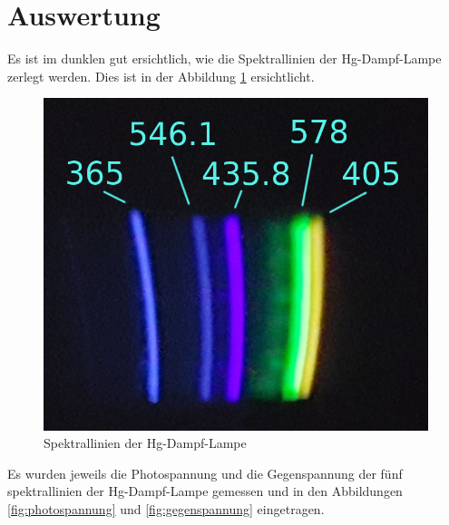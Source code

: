 \section{Auswertung}

Es ist im dunklen gut ersichtlich, wie  die  Spektrallinien der Hg-Dampf-Lampe
zerlegt  werden.  Dies   ist   in   der   Abbildung   \ref{fig:spektrallinien}
ersichtlicht.

\begin{figure}[H]
    \centering
    \includegraphics[width=.4\linewidth]{images/hg-spektrallinien.png}
    \caption{Spektrallinien der Hg-Dampf-Lampe}
    \label{fig:spektrallinien}
\end{figure}


Es  wurden  jeweils   die  Photospannung  und  die  Gegenspannung  der  f\"unf
spektrallinien   der   Hg-Dampf-Lampe   gemessen   und   in  den   Abbildungen
\ref{fig:photospannung}     und      \ref{fig:gegenspannung}      eingetragen.

